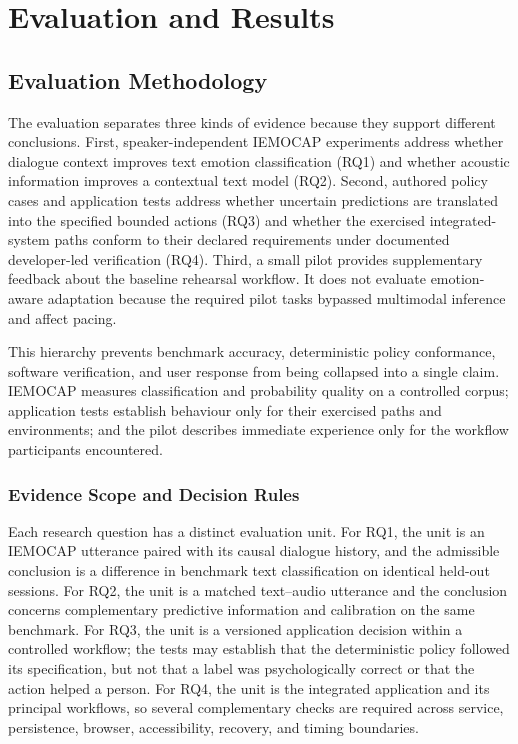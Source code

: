 \chapter{Evaluation and Results}
\label{chap5}

\section{Evaluation Methodology}
\label{sec:model-evaluation-methodology}

The evaluation separates three kinds of evidence because they support different conclusions. First, speaker-independent IEMOCAP experiments address whether dialogue context improves text emotion classification (RQ1) and whether acoustic information improves a contextual text model (RQ2). Second, authored policy cases and application tests address whether uncertain predictions are translated into the specified bounded actions (RQ3) and whether the exercised integrated-system paths conform to their declared requirements under documented developer-led verification (RQ4). Third, a small pilot provides supplementary feedback about the baseline rehearsal workflow. It does not evaluate emotion-aware adaptation because the required pilot tasks bypassed multimodal inference and affect pacing.

This hierarchy prevents benchmark accuracy, deterministic policy conformance, software verification, and user response from being collapsed into a single claim. IEMOCAP measures classification and probability quality on a controlled corpus; application tests establish behaviour only for their exercised paths and environments; and the pilot describes immediate experience only for the workflow participants encountered.

\subsection{Evidence Scope and Decision Rules}
\label{subsec:evaluation-scope}

Each research question has a distinct evaluation unit. For RQ1, the unit is an IEMOCAP utterance paired with its causal dialogue history, and the admissible conclusion is a difference in benchmark text classification on identical held-out sessions. For RQ2, the unit is a matched text--audio utterance and the conclusion concerns complementary predictive information and calibration on the same benchmark. For RQ3, the unit is a versioned application decision within a controlled workflow; the tests may establish that the deterministic policy followed its specification, but not that a label was psychologically correct or that the action helped a person. For RQ4, the unit is the integrated application and its principal workflows, so several complementary checks are required across service, persistence, browser, accessibility, recovery, and timing boundaries.

